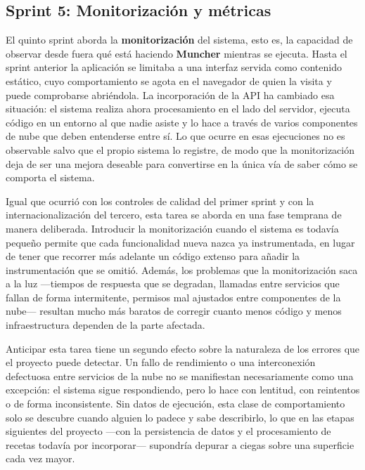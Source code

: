 \subsection*{Sprint 5: Monitorización y métricas}

El quinto sprint aborda la \textbf{monitorización} del sistema, esto es, la
capacidad de observar desde fuera qué está haciendo \textbf{Muncher} mientras
se ejecuta. Hasta el sprint anterior la aplicación se limitaba a una interfaz
servida como contenido estático, cuyo comportamiento se agota en el navegador
de quien la visita y puede comprobarse abriéndola. La incorporación de la API
ha cambiado esa situación: el sistema realiza ahora procesamiento en el lado
del servidor, ejecuta código en un entorno al que nadie asiste y lo hace a
través de varios componentes de nube que deben entenderse entre sí. Lo que
ocurre en esas ejecuciones no es observable salvo que el propio sistema lo
registre, de modo que la monitorización deja de ser una mejora deseable para
convertirse en la única vía de saber cómo se comporta el sistema.

Igual que ocurrió con los controles de calidad del primer sprint y con la
internacionalización del tercero, esta tarea se aborda en una fase temprana de
manera deliberada. Introducir la monitorización cuando el sistema es todavía
pequeño permite que cada funcionalidad nueva nazca ya instrumentada, en lugar
de tener que recorrer más adelante un código extenso para añadir la
instrumentación que se omitió. Además, los problemas que la monitorización
saca a la luz —tiempos de respuesta que se degradan, llamadas entre servicios
que fallan de forma intermitente, permisos mal ajustados entre componentes de
la nube— resultan mucho más baratos de corregir cuanto menos código y menos
infraestructura dependen de la parte afectada.

Anticipar esta tarea tiene un segundo efecto sobre la naturaleza de los errores
que el proyecto puede detectar. Un fallo de rendimiento o una interconexión
defectuosa entre servicios de la nube no se manifiestan necesariamente como una
excepción: el sistema sigue respondiendo, pero lo hace con lentitud, con
reintentos o de forma inconsistente. Sin datos de ejecución, esta clase de
comportamiento solo se descubre cuando alguien lo padece y sabe describirlo, lo
que en las etapas siguientes del proyecto —con la persistencia de datos y el
procesamiento de recetas todavía por incorporar— supondría depurar a ciegas
sobre una superficie cada vez mayor.

